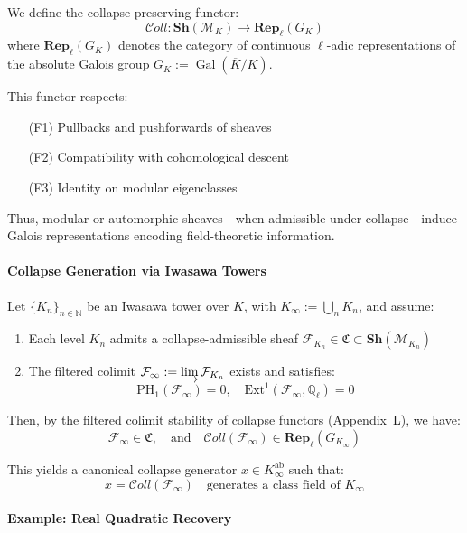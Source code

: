 \documentclass[11pt]{article}
\begin{document}
We define the collapse-preserving functor:
\[
\mathcal{C}oll : \mathbf{Sh}(\mathcal{M}_K) \longrightarrow \mathbf{Rep}_{\ell}(G_K)
\]
where \( \mathbf{Rep}_{\ell}(G_K) \) denotes the category of continuous \( \ell \)-adic representations of the absolute Galois group \( G_K := \operatorname{Gal}(\overline{K}/K) \).

This functor respects:
\begin{itemize}
    \item[(F1)] Pullbacks and pushforwards of sheaves
    \item[(F2)] Compatibility with cohomological descent
    \item[(F3)] Identity on modular eigenclasses
\end{itemize}

Thus, modular or automorphic sheaves—when admissible under collapse—induce Galois representations encoding field-theoretic information.

\medskip

\paragraph{Collapse Generation via Iwasawa Towers}

Let \( \{K_n\}_{n \in \mathbb{N}} \) be an Iwasawa tower over \( K \), with \( K_\infty := \bigcup_{n} K_n \), and assume:
\begin{enumerate}
    \item Each level \( K_n \) admits a collapse-admissible sheaf \( \mathcal{F}_{K_n} \in \mathfrak{C} \subset \mathbf{Sh}(\mathcal{M}_{K_n}) \)
    \item The filtered colimit \( \mathcal{F}_\infty := \varinjlim \mathcal{F}_{K_n} \) exists and satisfies:
    \[
    \mathrm{PH}_1(\mathcal{F}_\infty) = 0,\quad \mathrm{Ext}^1(\mathcal{F}_\infty, \mathbb{Q}_\ell) = 0
    \]
\end{enumerate}

Then, by the filtered colimit stability of collapse functors (Appendix~L), we have:
\[
\mathcal{F}_\infty \in \mathfrak{C}, \quad \text{and} \quad \mathcal{C}oll(\mathcal{F}_\infty) \in \mathbf{Rep}_\ell(G_{K_\infty})
\]

This yields a canonical collapse generator \( x \in K_\infty^{\mathrm{ab}} \) such that:
\[
x = \mathcal{C}oll(\mathcal{F}_\infty) \quad \text{generates a class field of } K_\infty
\]

\paragraph{Example: Real Quadratic Recovery}
\end{document}
